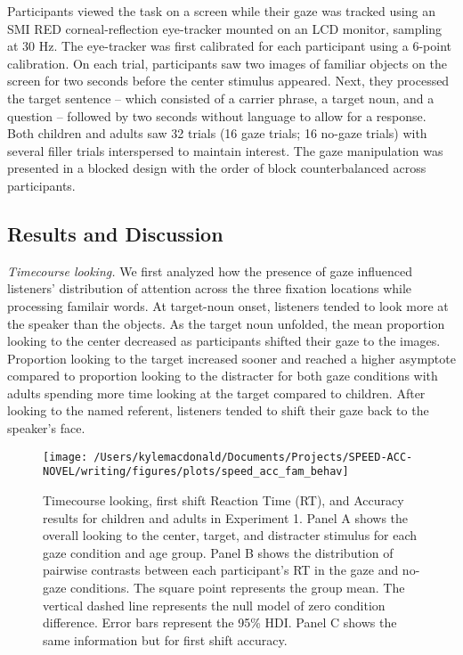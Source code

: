 \documentclass[man,floatsintext]{apa6}
\begin{document}
Participants viewed the task on a screen while their gaze was tracked
using an SMI RED corneal-reflection eye-tracker mounted on an LCD
monitor, sampling at 30 Hz. The eye-tracker was first calibrated for
each participant using a 6-point calibration. On each trial,
participants saw two images of familiar objects on the screen for two
seconds before the center stimulus appeared. Next, they processed the
target sentence -- which consisted of a carrier phrase, a target noun,
and a question -- followed by two seconds without language to allow for
a response. Both children and adults saw 32 trials (16 gaze trials; 16
no-gaze trials) with several filler trials interspersed to maintain
interest. The gaze manipulation was presented in a blocked design with
the order of block counterbalanced across participants.

\subsection{Results and Discussion}\label{results-and-discussion}

\emph{Timecourse looking.} We first analyzed how the presence of gaze
influenced listeners' distribution of attention across the three
fixation locations while processing familair words. At target-noun
onset, listeners tended to look more at the speaker than the objects. As
the target noun unfolded, the mean proportion looking to the center
decreased as participants shifted their gaze to the images. Proportion
looking to the target increased sooner and reached a higher asymptote
compared to proportion looking to the distracter for both gaze
conditions with adults spending more time looking at the target compared
to children. After looking to the named referent, listeners tended to
shift their gaze back to the speaker's face.

\begin{figure}[!t]

{\centering \texttt{[image: /Users/kylemacdonald/Documents/Projects/SPEED-ACC-NOVEL/writing/figures/plots/speed\_acc\_fam\_behav]} 

}

\caption{Timecourse looking, first shift Reaction Time (RT), and Accuracy results for children and adults in Experiment 1. Panel A shows the overall looking to the center, target, and distracter stimulus for each gaze condition and age group. Panel B shows the distribution of pairwise contrasts between each participant's RT in the gaze and no-gaze conditions. The square point represents the group mean. The vertical dashed line represents the null model of zero condition difference. Error bars represent the 95\% HDI. Panel C shows the same information but for first shift accuracy.}\label{fig:speed-acc-gaze-results}
\end{figure}
\end{document}
